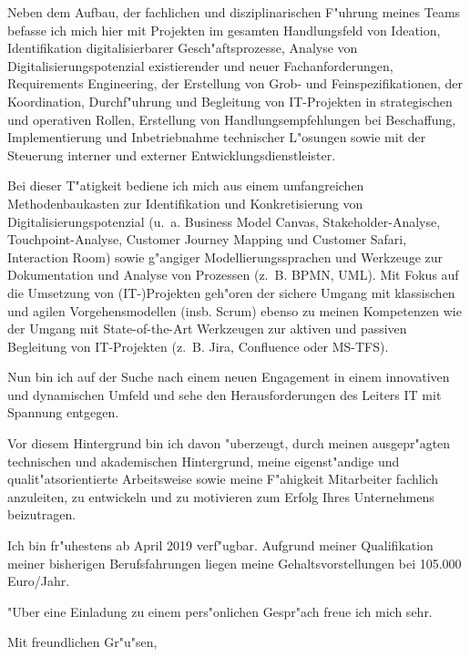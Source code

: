 \documentclass[11pt,a4paper]{dinbrief}
\begin{document}
\begin{letter}
Neben dem Aufbau, der fachlichen und disziplinarischen F"uhrung meines Teams befasse ich mich hier mit Projekten im gesamten Handlungsfeld von Ideation, Identifikation digitalisierbarer Gesch"aftsprozesse, Analyse von Digitalisierungspotenzial existierender und neuer Fachanforderungen, Requirements Engineering, der Erstellung von Grob- und Feinspezifikationen, der Koordination, Durchf"uhrung und Begleitung von IT-Projekten in strategischen und operativen Rollen, Erstellung von Handlungsempfehlungen bei Beschaffung, Implementierung und Inbetriebnahme technischer L"osungen sowie mit der Steuerung interner und externer Entwicklungsdienstleister. 

Bei dieser T"atigkeit bediene ich mich aus einem umfangreichen Methodenbaukasten zur Identifikation und Konkretisierung von Digitalisierungspotenzial (u.~a. Business Model Canvas, Stakeholder-Analyse, Touchpoint-Analyse, Customer Journey Mapping und Customer Safari, Interaction Room) sowie g"angiger Modellierungssprachen und Werkzeuge zur Dokumentation und Analyse von Prozessen (z.~B. BPMN, UML). Mit Fokus auf die Umsetzung von (IT-)Projekten geh"oren der sichere Umgang mit klassischen und agilen Vorgehensmodellen (insb. Scrum) ebenso zu meinen Kompetenzen wie der Umgang mit State-of-the-Art Werkzeugen zur aktiven und passiven Begleitung von IT-Projekten (z.~B. Jira, Confluence oder MS-TFS).

Nun bin ich auf der Suche nach einem neuen Engagement in einem innovativen und dynamischen Umfeld und sehe den Herausforderungen des  Leiters IT mit Spannung entgegen.

Vor diesem Hintergrund bin ich davon "uberzeugt, durch meinen ausgepr"agten technischen und akademischen Hintergrund, meine eigenst"andige und qualit"atsorientierte Arbeitsweise sowie meine F"ahigkeit Mitarbeiter fachlich anzuleiten, zu entwickeln und zu motivieren zum Erfolg Ihres Unternehmens beizutragen.

Ich bin fr"uhestens ab April 2019 verf"ugbar. Aufgrund meiner Qualifikation meiner bisherigen Berufsfahrungen liegen meine Gehaltsvorstellungen bei 105.000 Euro/Jahr. 

"Uber eine Einladung zu einem pers"onlichen Gespr"ach freue ich mich sehr.

\closing{Mit freundlichen Gr"u"sen,}
\end{letter}
\end{document}
